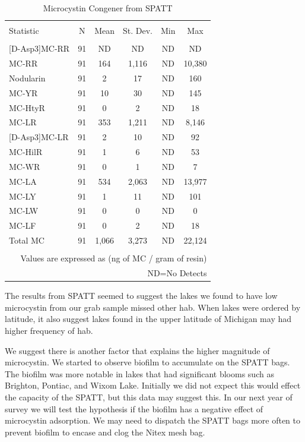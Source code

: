 \begin{table}[!ht]
\centering
  \caption{Microcystin Congener from SPATT}
  \label{tab:spattcongener}
\begin{tabular}{@{\extracolsep{5pt}}lccccc}
\\[-1.8ex]\hline
\hline \\[-1.8ex]
Statistic & \multicolumn{1}{c}{N} & \multicolumn{1}{c}{Mean} & \multicolumn{1}{c}{St. Dev.} & \multicolumn{1}{c}{Min} & \multicolumn{1}{c}{Max} \\
\hline \\[-1.8ex]
{[D-Asp3]}MC-RR & 91 & ND & ND & ND & ND \\
MC-RR & 91 & 164 & 1,116 & ND & 10,380 \\
Nodularin & 91 & 2 & 17 & ND & 160 \\
MC-YR & 91 & 10 & 30 & ND & 145 \\
MC-HtyR & 91 & 0 & 2 & ND & 18 \\
MC-LR & 91 & 353 & 1,211 & ND & 8,146 \\
{[D-Asp3]}MC-LR & 91 & 2 & 10 & ND & 92 \\
MC-HilR & 91 & 1 & 6 & ND & 53 \\
MC-WR & 91 & 0 & 1 & ND & 7 \\
MC-LA & 91 & 534 & 2,063 & ND & 13,977 \\
MC-LY & 91 & 1 & 11 & ND & 101 \\
MC-LW & 91 & 0 & 0 & ND & 0 \\
MC-LF & 91 & 0 & 2 & ND & 18 \\
Total MC & 91 & 1,066 & 3,273 & ND & 22,124 \\
\hline \\[-1.8ex]
\multicolumn{6}{r}{Values are expressed as (ng of MC / gram of resin)} \\
\multicolumn{6}{r}{ND=No Detects} \\
\end{tabular}
\end{table}


\clearpage
\newpage


The results from SPATT seemed to suggest the lakes we found to have low microcystin from our grab sample missed other \gls{hab}. When lakes were ordered by latitude, it also suggest lakes found in the upper latitude of Michigan may had higher frequency of \gls{hab}.

We suggest there is another factor that explains the higher magnitude of microcystin. We started to observe biofilm to accumulate on the SPATT bags. The biofilm was more notable in lakes that had significant blooms such as Brighton, Pontiac, and Wixom Lake. Initially we did not expect this would effect the capacity of the SPATT, but this data may suggest this. In our next year of survey we will test the hypothesis if the biofilm has a negative effect of microcystin adsorption. We may need to dispatch the SPATT bags more often to prevent biofilm to encase and clog the Nitex mesh bag.
